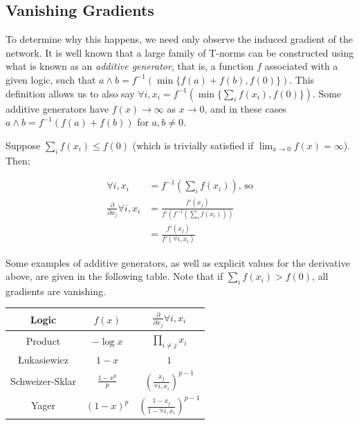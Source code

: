 \subsection{Vanishing Gradients}
\label{section:prodvanishgradient}

To determine why this happens, we need only observe the induced gradient of the network. It is well known that a large family of T-norms can be constructed using what is known as an \textit{additive generator}, that is, a function $f$ associated with a given logic, such that $a \land b = f^{-1}(\min\{f(a) + f(b),f(0)\})$. This definition allows us to also say $\forall i, x_i = f^{-1}(\min\{\sum_i f(x_i),f(0)\})$. Some additive generators have $f(x) \rightarrow \infty$ as $x \rightarrow 0$, and in these cases $a \land b = f^{-1}(f(a) + f(b))$ for $a, b \neq 0$.

Suppose $\sum_i f(x_i) \leq f(0)$ (which is trivially satisfied if $\lim_{x\rightarrow 0}f(x) = \infty$). Then;

$$
\begin{aligned}
\forall i, x_i 
&= f^{-1}(\sum_i f(x_i)) \text{, so} \\
\frac{\partial}{\partial x_j} \forall i, x_i 
&= \frac{
f'(x_j)
}{
f'(f^{-1}(\sum_i f(x_i)))
} \\
&= \frac{
f'(x_j)
}{
f'(\forall i, x_i )
}
\end{aligned}
$$

Some examples of additive generators, as well as explicit values for the derivative above, are given in the following table. Note that if $\sum_i f(x_i) > f(0)$, all gradients are vanishing.

\begin{center}
    \begin{tabular}{ c | c c }
        Logic & $f(x)$ & $\frac{\partial}{\partial x_j} \forall i, x_i$ \\    
        \hline
        Product 
        & $-\log x$
        & $\prod_{i \neq j} x_i$ \\
        Łukasiewicz
        & $1 - x$ 
        & $1$ \\
        Schweizer-Sklar
        & $\frac{1-x^p}{p}$ 
        & $\left(\frac{x_j}{\forall i, x_i}\right)^{p-1}$ \\
        Yager
        & $(1-x)^p$ 
        & $\left(\frac{1-x_j}{1-\forall i, x_i}\right)^{p-1}$ \\
    \end{tabular}
\end{center}

